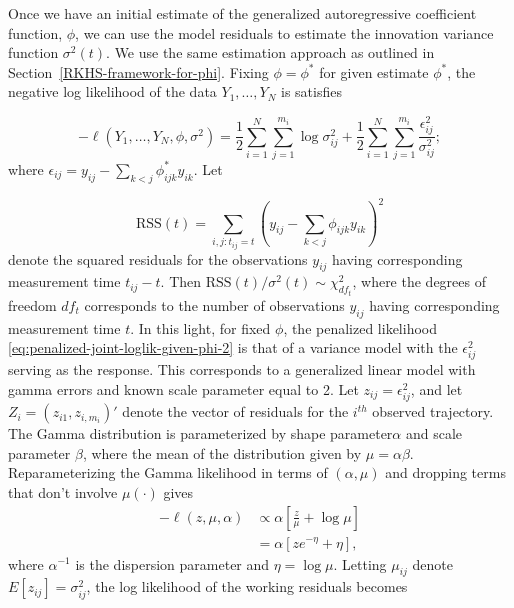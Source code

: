 \documentclass[../chapter-2-spline-representation.tex]{subfiles}
\begin{document}
Once we have an initial estimate of the generalized autoregressive coefficient function, $\phi$, we can use the model residuals to estimate the innovation variance function $\sigma^2\left(t\right)$. We use the same estimation approach as outlined in Section~\ref{RKHS-framework-for-phi}. Fixing $\phi = \phi^*$ for given estimate $\phi^*$, the negative log likelihood of the data $Y_1,\dots, Y_N$ is satisfies

\begin{equation} \label{eq:penalized-joint-loglik-given-phi-2}
-\ell\left( Y_1,\dots, Y_N, \phi, \sigma^2 \right) =  \frac{1}{2}\sum_{i = 1}^N \sum_{j = 1}^{m_i} \log \sigma^2_{ij}  + \frac{1}{2}\sum_{i = 1}^N \sum_{j = 1}^{m_i} \frac {\epsilon_{ij}^2}{\sigma^2_{ij}};
\end{equation}
\noindent
where $\epsilon_{ij} =  y_{ij} - \sum_{k<j} \phi^*_{ijk} y_{ik}$. Let 

\begin{equation}
\mbox{RSS}\left( t \right) = \sum_{i,j:t_{ij}= t} \left( y_{ij} - \sum_{k<j} \phi_{ijk} y_{ik}\right)^2
\end{equation}
\noindent
denote the squared residuals for the observations $y_{ij}$ having corresponding measurement time $t_{ij} - t$. Then $\mbox{RSS}\left( t \right)/\sigma^2\left(t\right) \sim \chi^2_{df_t}$, where the degrees of freedom $df_{t}$ corresponds to the number of observations $y_{ij}$ having corresponding measurement time $t$. In this light, for fixed $\phi$, the penalized likelihood \ref{eq:penalized-joint-loglik-given-phi-2} is that of a variance model with the $\epsilon_{ij}^2$ serving as the response.  This corresponds to a generalized linear model with gamma errors and known scale parameter equal to 2. Let $z_{ij} = \epsilon_{ij}^2$, and let $Z_{i} = \left(z_{i1},z_{i,m_i} \right)'$ denote the vector of residuals for the $i^{th}$ observed trajectory. The Gamma distribution is parameterized by shape parameter$\alpha$ and scale parameter $\beta$, where the mean of the distribution given by $\mu = \alpha \beta$. Reparameterizing the Gamma likelihood in terms of $\left(\alpha, \mu \right)$ and dropping terms that don't involve $\mu\left(\cdot\right)$ gives  
\begin{align}
-\ell\left(z,\mu, \alpha \right) &\propto \alpha\left[\frac{z}{\mu} + \log \mu\right]  \label{eq:gamma-iv-likelihood} \\ 
&= \alpha\left[ze^{-\eta} + \eta\right],\label{eq:gamma-iv-likelihood-canonical-link}
\end{align}
\noindent
where $\alpha^{-1}$ is the dispersion parameter and $\eta = \log \mu$. Letting $\mu_{ij}$ denote $E\left[ z_{ij} \right] = \sigma_{ij}^2$, the log likelihood of the working residuals becomes 
\end{document}
